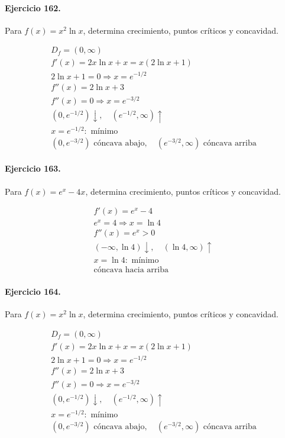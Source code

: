 \documentclass[11pt,a4paper]{article}
\begin{document}
\paragraph{Ejercicio 162.} Para $f(x)=x^2\ln x$, determina crecimiento, puntos críticos y concavidad.

\[
\begin{aligned}
D_f=(0,\infty)\\
f'(x)=2x\ln x+x=x(2\ln x+1)\\
2\ln x+1=0\Rightarrow x=e^{-1/2}\\
f''(x)=2\ln x+3\\
f''(x)=0\Rightarrow x=e^{-3/2}\\
(0,e^{-1/2})\downarrow,\quad(e^{-1/2},\infty)\uparrow\\
x=e^{-1/2}:\text{{ mínimo}}\\
(0,e^{-3/2})\text{{ cóncava abajo}},\quad(e^{-3/2},\infty)\text{{ cóncava arriba}}
\end{aligned}
\]


\paragraph{Ejercicio 163.} Para $f(x)=e^x-4x$, determina crecimiento, puntos críticos y concavidad.

\[
\begin{aligned}
f'(x)=e^x-4\\
e^x=4\Rightarrow x=\ln 4\\
f''(x)=e^x>0\\
(-\infty,\ln 4)\downarrow,\quad(\ln 4,\infty)\uparrow\\
x=\ln 4:\text{ mínimo}\\
\text{{cóncava hacia arriba}}
\end{aligned}
\]


\paragraph{Ejercicio 164.} Para $f(x)=x^2\ln x$, determina crecimiento, puntos críticos y concavidad.

\[
\begin{aligned}
D_f=(0,\infty)\\
f'(x)=2x\ln x+x=x(2\ln x+1)\\
2\ln x+1=0\Rightarrow x=e^{-1/2}\\
f''(x)=2\ln x+3\\
f''(x)=0\Rightarrow x=e^{-3/2}\\
(0,e^{-1/2})\downarrow,\quad(e^{-1/2},\infty)\uparrow\\
x=e^{-1/2}:\text{{ mínimo}}\\
(0,e^{-3/2})\text{{ cóncava abajo}},\quad(e^{-3/2},\infty)\text{{ cóncava arriba}}
\end{aligned}
\]
\end{document}
